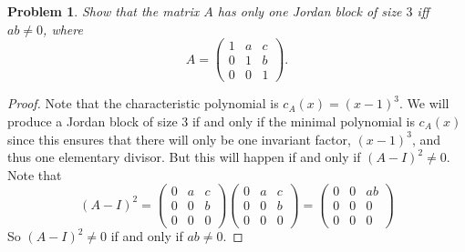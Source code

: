 \documentclass{article}
\newtheorem{problem}{Problem}
\begin{document}
\begin{problem}
Show that the matrix $A$ has only one Jordan block of size $3$ iff $ab \neq 0$, where
\[
A =
\left (
\begin{array}{ccc}
1 & a & c\\
0 & 1 & b\\
0 & 0 & 1
\end{array}
\right ).
\]
\end{problem}
\begin{proof}
Note that the characteristic polynomial is $c_A(x) = (x-1)^3$. We will produce a Jordan block of size $3$ if and only if the minimal polynomial is $c_A(x)$ since this ensures that there will only be one invariant factor, $(x-1)^3$, and thus one elementary divisor. But this will happen if and only if $(A-I)^2 \neq 0$. Note that
\[
(A-I)^2 =
\left (
\begin{array}{ccc}
0 & a & c\\
0 & 0 & b\\
0 & 0 & 0
\end{array}
\right )
\left (
\begin{array}{ccc}
0 & a & c\\
0 & 0 & b\\
0 & 0 & 0
\end{array}
\right )
=
\left (
\begin{array}{ccc}
0 & 0 & ab\\
0 & 0 & 0\\
0 & 0 & 0
\end{array}
\right )
\]
So $(A-I)^2 \neq 0$ if and only if $ab \neq 0$.
\end{proof}
\end{document}
